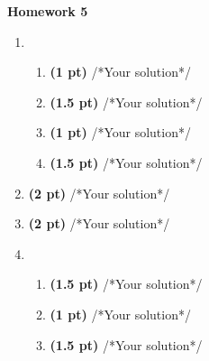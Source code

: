 \documentclass{article}
\begin{document}
\begin{center}
    {\Large \textbf{Homework 5}} \\
\end{center}
\begin{enumerate}
    \item 
    \begin{enumerate}
    	\item  \textbf{(1 pt)}  /*Your solution*/
    	\item  \textbf{(1.5 pt)}  /*Your solution*/
    	\item  \textbf{(1 pt)}  /*Your solution*/
    	\item  \textbf{(1.5 pt)}  /*Your solution*/
    \end{enumerate}
    
    \item  \textbf{(2 pt)}  /*Your solution*/
    \item  \textbf{(2 pt)}  /*Your solution*/
    
   	\item 
   	\begin{enumerate}
   		\item  \textbf{(1.5 pt)}  /*Your solution*/
   		\item  \textbf{(1 pt)}  /*Your solution*/
   		\item  \textbf{(1.5 pt)}  /*Your solution*/
   	\end{enumerate}
\end{enumerate}
\end{document}

